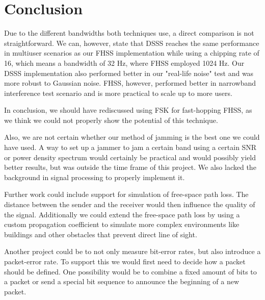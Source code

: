 \section{Conclusion}
    
    
    Due to the different bandwidths both techniques use, a direct comparison is not straightforward. We can, however, state that DSSS reaches the same performance in multiuser scenarios as our FHSS implementation while using a chipping rate of 16, which means a bandwidth of 32 Hz, where FHSS employed 1024 Hz. Our DSSS implementation also performed better in our "real-life noise" test and was more robust to Gaussian noise. FHSS, however, performed better in narrowband interference test scenario and is more practical to scale up to more users.
    
    In conclusion, we should have rediscussed using FSK for fast-hopping FHSS, as we think we could not properly show the potential of this technique.
    
    Also, we are not certain whether our method of jamming is the best one we could have used. A way to set up a jammer to jam a certain band using a certain SNR or power density spectrum would certainly be practical and would possibly yield better results, but was outside the time frame of this project. We also lacked the background in signal processing to properly implement it.
    
    
    Further work could include support for simulation of free-space path loss. The distance between the sender and the receiver would then influence the quality of the signal. Additionally we could extend the free-space path loss by using a custom propagation coefficient to simulate more complex environments like buildings and other obstacles that prevent direct line of sight.
    
    
    Another project could be to not only measure bit-error rates, but also introduce a packet-error rate. To support this we would first need to decide how a packet should be defined. One possibility would be to combine a fixed amount of bits to a packet or send a special bit sequence to announce the beginning of a new packet.